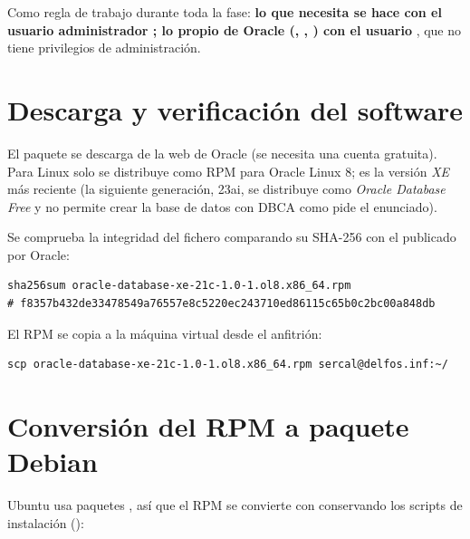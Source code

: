 Como regla de trabajo durante toda la fase: \textbf{lo que necesita
 se hace con el usuario administrador ; lo propio de Oracle
(, , ) con el usuario }, que no
tiene privilegios de administración.

\section{Descarga y verificación del software}
\label{sec:descarga}

El paquete se descarga de la web de Oracle (se necesita una cuenta gratuita).
Para Linux solo se distribuye como RPM para Oracle Linux 8; es la versión
\emph{XE} más reciente (la siguiente generación, 23ai, se distribuye como
\emph{Oracle Database Free} y no permite crear la base de datos con DBCA como
pide el enunciado).


Se comprueba la integridad del fichero comparando su SHA-256 con el publicado por
Oracle:

\begin{lstlisting}[style=bash]
sha256sum oracle-database-xe-21c-1.0-1.ol8.x86_64.rpm
# f8357b432de33478549a76557e8c5220ec243710ed86115c65b0c2bc00a848db
\end{lstlisting}


El RPM se copia a la máquina virtual desde el anfitrión:

\begin{lstlisting}[style=bash]
scp oracle-database-xe-21c-1.0-1.ol8.x86_64.rpm sercal@delfos.inf:~/
\end{lstlisting}


\section{Conversión del RPM a paquete Debian}
\label{sec:alien}

Ubuntu usa paquetes , así que el RPM se convierte con 
conservando los scripts de instalación ():

